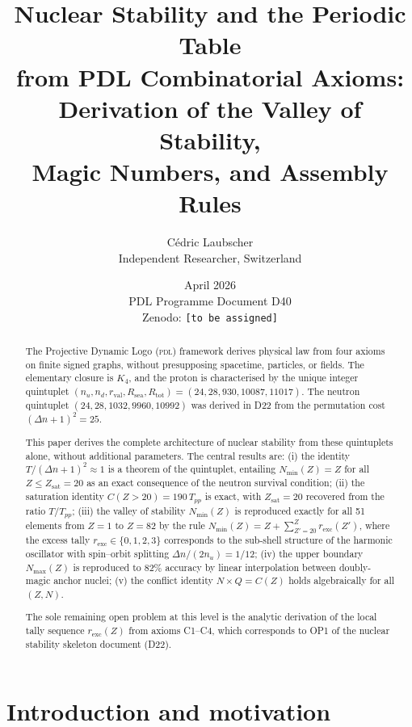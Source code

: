 \documentclass{article}
\title{\textbf{Nuclear Stability and the Periodic Table\\
from PDL Combinatorial Axioms:\\
Derivation of the Valley of Stability,\\
Magic Numbers, and Assembly Rules}}
\author{C\'edric Laubscher\\
\small Independent Researcher, Switzerland\\}
\date{April 2026\\[0.5em]
\small PDL Programme Document D40\\
\small Zenodo: \texttt{[to be assigned]}}
\theoremstyle{remark}
\newcommand{\PDL}{\textsc{pdl}}
\newcommand{\Kfour}{K_4}
\newcommand{\Rsea}{R_{\mathrm{sea}}}
\newcommand{\Rtot}{R_{\mathrm{tot}}}
\newcommand{\rval}{r_{\mathrm{val}}}
\newcommand{\Tpp}{T_{pp}}
\newcommand{\Zsat}{Z_{\mathrm{sat}}}
\newcommand{\Nmin}{N_{\min}}
\newcommand{\Nmax}{N_{\max}}
\newcommand{\Deltanop}{\Delta n}
\begin{document}
\maketitle

\bigskip

\begin{abstract}
The Projective Dynamic Logo (\PDL) framework derives physical law from four axioms on finite signed graphs, without presupposing spacetime, particles, or fields. The elementary closure is $\Kfour$, and the proton is characterised by the unique integer quintuplet $(n_u, n_d, \rval, \Rsea, \Rtot) = (24, 28, 930, 10087, 11017)$. The neutron quintuplet $(24, 28, 1032, 9960, 10992)$ was derived in D22 from the permutation cost $(\Deltanop+1)^2 = 25$.

This paper derives the complete architecture of nuclear stability from these quintuplets alone, without additional parameters. The central results are: (i) the identity $T/(\Deltanop+1)^2 \approx 1$ is a theorem of the quintuplet, entailing $\Nmin(Z) = Z$ for all $Z \leq \Zsat = 20$ as an exact consequence of the neutron survival condition; (ii) the saturation identity $C(Z > 20) = 190\,\Tpp$ is exact, with $\Zsat = 20$ recovered from the ratio $T/\Tpp$; (iii) the valley of stability $\Nmin(Z)$ is reproduced exactly for all 51 elements from $Z=1$ to $Z=82$ by the rule $\Nmin(Z) = Z + \sum_{Z'=20}^{Z} r_{\mathrm{exc}}(Z')$, where the excess tally $r_{\mathrm{exc}} \in \{0,1,2,3\}$ corresponds to the sub-shell structure of the harmonic oscillator with spin--orbit splitting $\Deltanop/(2n_u) = 1/12$; (iv) the upper boundary $\Nmax(Z)$ is reproduced to 82\% accuracy by linear interpolation between doubly-magic anchor nuclei; (v) the conflict identity $N \times Q = C(Z)$ holds algebraically for all $(Z,N)$.

The sole remaining open problem at this level is the analytic derivation of the local tally sequence $r_{\mathrm{exc}}(Z)$ from axioms C1--C4, which corresponds to OP1 of the nuclear stability skeleton document (D22).
\end{abstract}

\newpage

\tableofcontents

\newpage

\section{Introduction and motivation}
\label{sec:intro}
\end{document}
